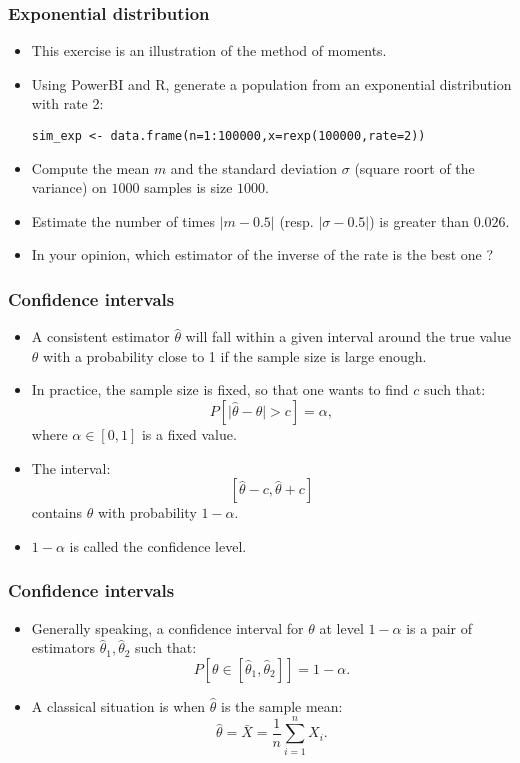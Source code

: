 \documentclass[main.tex]{subfiles}
\begin{document}
\begin{frame}[fragile]
    \frametitle{Exponential distribution}
    \begin{itemize}
        \item<+-> This exercise is an illustration of the method of moments.
        \item<+-> Using PowerBI and R, generate a population from an exponential distribution with rate 2:
\begin{verbatim}
sim_exp <- data.frame(n=1:100000,x=rexp(100000,rate=2))
\end{verbatim}
        \item<+-> Compute the mean $m$ and the standard deviation $\sigma$ (square roort of the variance) on $1000$ samples is size $1000$.
        \item<+-> Estimate the number of times $\lvert m - 0.5 \rvert$ (resp. $\lvert \sigma - 0.5 \rvert$) is greater than $0.026.$
        \item<+-> In your opinion, which estimator of the inverse of the rate is the best one ?
    \end{itemize}
\end{frame}

\begin{frame}
    \frametitle{Confidence intervals}
    \begin{itemize}
        \item<+-> A consistent estimator $\hat{\theta}$ will fall within a given interval around the true value $\theta$ with a probability close to 1
        if the sample size is large enough.
        \item<+-> In practice, the sample size is fixed, so that one wants to find $c$ such that:
        \begin{equation}
            P\left[ \lvert \hat{\theta} - \theta \rvert > c \right] = \alpha,
        \end{equation}
        where $\alpha \in [0,1]$ is a fixed value.
        \item<+-> The interval:
        \[
        \left[ \hat{\theta}-c, \hat{\theta} + c \right]
        \]
        contains $\theta$ with probability $1- \alpha.$
        \item<+-> $1-\alpha$ is called the confidence level.
    \end{itemize}
\end{frame}

\begin{frame}
    \frametitle{Confidence intervals}
    \begin{itemize}
        \item<+-> Generally speaking, a confidence interval for $\theta$ at level $1-\alpha$ is a pair of estimators $\hat{\theta}_1, \hat{\theta}_2$ 
        such that:
        \[
        P\left[\theta \in  \left[ \hat{\theta}_1, \hat{\theta}_2\right] \right] = 1-\alpha.
        \]
        \item<+-> A classical situation is when $\hat{\theta}$ is the sample mean:
        \[
        \hat{\theta} = \bar{X} = \frac{1}{n} \sum_{i=1}^n X_i.
        \]
    \end{itemize}
\end{frame}
\end{document}
